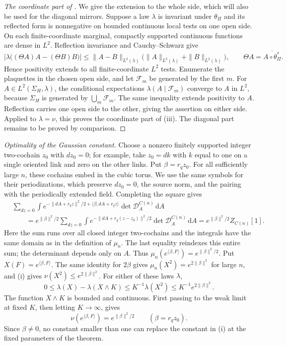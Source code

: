 \documentclass[11pt,letterpaper,reqno]{amsart}
\newcommand{\dd}{\mathrm d}
\begin{document}
\begin{proof}[The coordinate part of ]
\label{par:side-density}
We give the extension to the whole side, which will also be used
for the diagonal mirrors. Suppose a law $\lambda$ is invariant
under $\theta_\Pi$ and its reflected form is nonnegative on
bounded continuous local tests on one open side. On each
finite-coordinate marginal, compactly supported continuous
functions are dense in $L^2$. Reflection invariance and
Cauchy--Schwarz give
\[
 \left|\lambda\bigl((\Theta A)A-(\Theta B)B\bigr)\right|
 \le\|A-B\|_{L^2(\lambda)}
       \bigl(\|A\|_{L^2(\lambda)}+\|B\|_{L^2(\lambda)}\bigr),
 \qquad \Theta A=\overline{A\circ\theta_\Pi^*}.
\]
Hence positivity extends to all finite-coordinate $L^2$ tests.
Enumerate the plaquettes in the chosen open side, and let
$\mathcal F_m$ be generated by the first $m$. For
$A\in L^2(\Sigma_H,\lambda)$, the conditional expectations
$\lambda(A\mid\mathcal F_m)$ converge to $A$ in $L^2$, because
$\Sigma_H$ is generated by $\bigcup_m\mathcal F_m$. The same
inequality extends positivity to $A$. Reflection carries one
open side to the other, giving the assertion on either side.
Applied to $\lambda=\nu$, this proves the coordinate part of
\textup{(iii)}. The diagonal part remains to be proved by comparison.
\end{proof}

\medskip\noindent
\emph{Optimality of the Gaussian constant.}
Choose a nonzero finitely supported integer two-cochain $z_0$ with
$dz_0=0$; for example, take $z_0=dk$ with $k$ equal to one on a
single oriented link and zero on the other links. Put $\beta=r_qz_0$.
For all sufficiently large $n$, these cochains embed in the cubic
torus. We use the same symbols for their periodizations, which
preserve $dz_0=0$, the source norm, and the pairing with the
periodically extended field. Completing the square gives
\[
\begin{split}
 &\sum_{dz=0}\int
 e^{-\|dA+r_qz\|^2/2+\langle\beta,dA+r_qz\rangle}
       \det\mathcal D_A^{C(n)}\,\dd A\\
 &\qquad =
 e^{\|\beta\|^2/2}\sum_{dz=0}\int
 e^{-\|dA+r_q(z-z_0)\|^2/2}
       \det\mathcal D_A^{C(n)}\,\dd A
 =e^{\|\beta\|^2/2}Z_{C(n)}[1].
\end{split}
\]
Here the sum runs over all closed integer two-cochains and the
integrals have the same domain as in the definition of $\mu_n$.
The last equality reindexes this entire sum; the determinant
depends only on $A$. Thus
$\mu_n(e^{\langle\beta,F\rangle})=e^{\|\beta\|^2/2}$.
Put $X(F)=e^{\langle\beta,F\rangle}$. The same identity for
$2\beta$ gives $\mu_n(X^2)=e^{2\|\beta\|^2}$ for large $n$,
and \textup{(i)} gives $\nu(X^2)\le e^{2\|\beta\|^2}$.
For either of these laws $\lambda$,
\[
 0\le\lambda(X)-\lambda(X\wedge K)
 \le K^{-1}\lambda(X^2)\le K^{-1}e^{2\|\beta\|^2}.
\]
The function $X\wedge K$ is bounded and continuous. First passing
to the weak limit at fixed $K$, then letting $K\to\infty$, gives
\[
 \nu(e^{\langle\beta,F\rangle})=e^{\|\beta\|^2/2}
 \qquad(\beta=r_qz_0).
\]
Since $\beta\ne0$, no constant smaller than one can replace the
constant in \textup{(i)} at the fixed parameters of the theorem.
\end{document}
